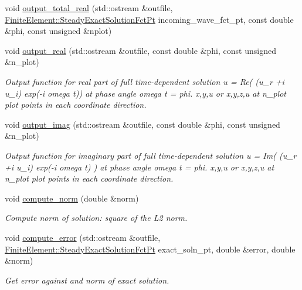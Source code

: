 \begin{DoxyCompactItemize}
void \hyperlink{classoomph_1_1PMLTimeHarmonicLinearElasticityEquations_adc716e5d41eceaefd8eb76479dd72650}{output\+\_\+total\+\_\+real} (std\+::ostream \&outfile, \hyperlink{classoomph_1_1FiniteElement_a690fd33af26cc3e84f39bba6d5a85202}{Finite\+Element\+::\+Steady\+Exact\+Solution\+Fct\+Pt} incoming\+\_\+wave\+\_\+fct\+\_\+pt, const double \&phi, const unsigned \&nplot)
\item 
void \hyperlink{classoomph_1_1PMLTimeHarmonicLinearElasticityEquations_aee6212321a7224dccef2a98963fd7987}{output\+\_\+real} (std\+::ostream \&outfile, const double \&phi, const unsigned \&n\+\_\+plot)
\begin{DoxyCompactList}\small\item\em Output function for real part of full time-\/dependent solution u = Re( (u\+\_\+r +i u\+\_\+i) exp(-\/i omega t)) at phase angle omega t = phi. x,y,u or x,y,z,u at n\+\_\+plot plot points in each coordinate direction. \end{DoxyCompactList}\item 
void \hyperlink{classoomph_1_1PMLTimeHarmonicLinearElasticityEquations_a79883a8a8d133f4b932734b45aab2d49}{output\+\_\+imag} (std\+::ostream \&outfile, const double \&phi, const unsigned \&n\+\_\+plot)
\begin{DoxyCompactList}\small\item\em Output function for imaginary part of full time-\/dependent solution u = Im( (u\+\_\+r +i u\+\_\+i) exp(-\/i omega t) ) at phase angle omega t = phi. x,y,u or x,y,z,u at n\+\_\+plot plot points in each coordinate direction. \end{DoxyCompactList}\item 
void \hyperlink{classoomph_1_1PMLTimeHarmonicLinearElasticityEquations_af71b0560271b3e27c74b39f6b247fc81}{compute\+\_\+norm} (double \&norm)
\begin{DoxyCompactList}\small\item\em Compute norm of solution\+: square of the L2 norm. \end{DoxyCompactList}\item 
void \hyperlink{classoomph_1_1PMLTimeHarmonicLinearElasticityEquations_aa31bde12e3ac92343050712b8b24c5fb}{compute\+\_\+error} (std\+::ostream \&outfile, \hyperlink{classoomph_1_1FiniteElement_a690fd33af26cc3e84f39bba6d5a85202}{Finite\+Element\+::\+Steady\+Exact\+Solution\+Fct\+Pt} exact\+\_\+soln\+\_\+pt, double \&error, double \&norm)
\begin{DoxyCompactList}\small\item\em Get error against and norm of exact solution. \end{DoxyCompactList}\item 

\end{DoxyCompactItemize}
